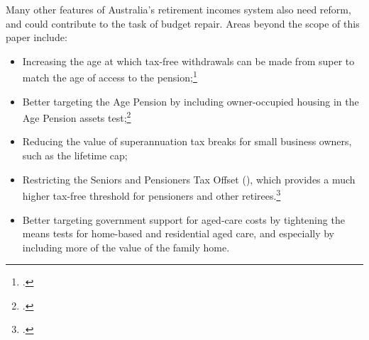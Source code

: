 \documentclass[continuous]{grattan}\usepackage[]{graphicx}\usepackage[]{color}
\begin{document}
Many other features of Australia's retirement incomes system also need reform, and could contribute to the task of budget repair. Areas beyond the scope of this paper include:

\begin{itemize}
\item
  Increasing the age at which tax-free withdrawals can be made from super to match the age of access to the pension;\footcite[][29]{DaleyMcGannonSavageEtAl2013BalancingBudgets}
\item
  Better targeting the Age Pension by including owner-occupied housing in the Age Pension assets test;\footcite[][37]{DaleyMcGannonSavageEtAl2013BalancingBudgets}
\item
  Reducing the value of superannuation tax breaks for small business owners, such as the lifetime \CGT{} cap;
  \xxxx
\item
  Restricting the Seniors and Pensioners Tax Offset (\SAPTO{}), which provides a much higher tax-free threshold for pensioners and other retirees.\footcite[][10]{ACOSS2015--Sub-to-Govt-Retirement-Incomes-Review}
\item
  Better targeting government support for aged-care costs by tightening the means tests for home-based and residential aged care, and especially by including more of the value of the family home.
\end{itemize}




\printbibliography
\end{document}
